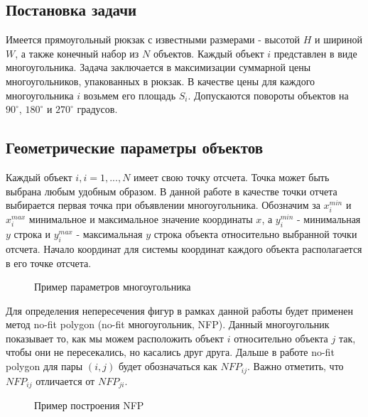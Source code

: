 \documentclass[a4paper]{article}
\begin{document}
	\subsection{Постановка задачи}
    Имеется прямоугольный рюкзак с известными размерами - высотой $H$ и шириной $W$, а также конечный набор из $N$ объектов. Каждый объект $i$ представлен в виде многоугольника. Задача заключается в максимизации суммарной цены многоугольников, упакованных в рюкзак. В качестве цены для каждого многоугольника $i$ возьмем его площадь $S_i$. Допускаются повороты объектов на $90^\circ$, $180^\circ$ и $270^\circ$ градусов.

    \subsection{Геометрические параметры объектов}

    Каждый объект $i, i = 1,...,N$ имеет свою точку отсчета. Точка может быть выбрана любым удобным образом. В данной работе в качестве точки отчета выбирается первая точка при объявлении многоугольника. Обозначим за $x_i^{min}$ и $x_i^{max}$ минимальное и максимальное значение координаты $x$, а $y_i^{min}$ - минимальная $y$ строка и $y_i^{max}$ - максимальная $y$ строка объекта относительно выбранной точки отсчета. Начало координат для системы координат каждого объекта располагается в его точке отсчета. 

    \begin{figure}[h!]
        \centering
        {\normalsize %
        \scalebox{0.7}{} }
        \caption{Пример параметров многоугольника}
		\label{Figure1}
	\end{figure}

    Для определения непересечения фигур в рамках данной работы будет применен метод no-fit polygon (no-fit многоугольник, NFP). Данный многоугольник показывает то, как мы можем расположить объект $i$ относительно объекта $j$ так, чтобы они не пересекались, но касались друг друга. Дальше в работе no-fit polygon для пары $(i, j)$ будет обозначаться как $NFP_{ij}$. Важно отметить, что $NFP_{ij}$ отличается от $NFP_{ji}$.

    \begin{figure}[h!]
    \centering
        {\huge %
        \scalebox{0.4}{} }
        \caption{Пример построения NFP}
		\label{Figure1}

    \end{figure}
\end{document}
